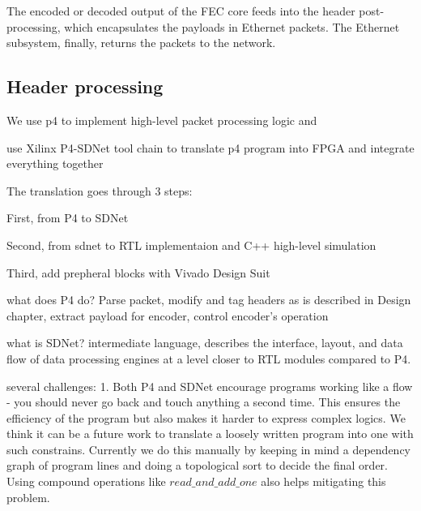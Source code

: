 The encoded or decoded output of the FEC core feeds into the header
post-processing, which encapsulates the payloads in Ethernet packets.  The
Ethernet subsystem, finally, returns the packets to the network.

\subsection{Header processing}

We use p4 to implement high-level packet processing logic and 

use Xilinx P4-SDNet tool chain to translate p4 program into FPGA and integrate everything together

The translation goes through 3 steps:

First, from P4 to SDNet

Second, from sdnet to RTL implementaion and C++ high-level simulation

Third, add prepheral blocks with Vivado Design Suit

what does P4 do?
Parse packet, modify and tag headers as is described in Design chapter, extract payload for encoder,
control encoder's operation

what is SDNet?
intermediate language, describes the interface, layout, and data flow of data processing engines
at a level closer to RTL modules compared to P4.



several challenges:
1. Both P4 and SDNet encourage programs working like a flow - you should never go back and touch anything
a second time. This ensures the efficiency of the program but also makes it harder to express complex
logics. We think it can be a future work to translate a loosely written program into one with such constrains.
Currently we do this manually by keeping in mind a dependency graph of program lines and doing a topological sort
to decide the final order. Using compound operations like
$read\_and\_add\_one$ also helps mitigating this problem.

